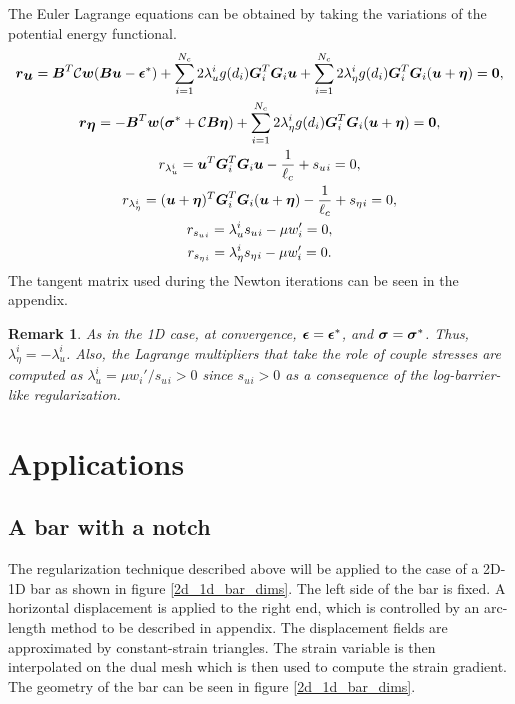 \documentclass[10pt]{elsarticle}
\newtheorem*{remark}{Remark}
\begin{document}
The Euler Lagrange equations can be obtained by taking the variations of the potential energy functional.
\begin{gather}
	\mbox{\boldmath $r$}_{\mbox{\boldmath $u$}} = \mbox{\boldmath $B$}^T \mathcal{C} \mbox{\boldmath $w$}(\mbox{\boldmath $B$} \mbox{\boldmath $u$} - \mbox{\boldmath $\epsilon$}^*) + \sum_{i=1}^{N_c} 2 \lambda_u^ i  g(d_i) \mbox{\boldmath $G$}_i ^T \mbox{\boldmath $G$}_i \mbox{\boldmath $u$}
	+\sum_{i=1}^{N_c} 2 \lambda_\eta^ i  g(d_i) \mbox{\boldmath $G$}_i ^T \mbox{\boldmath $G$}_i (\mbox{\boldmath $u$}+\mbox{\boldmath $\eta$}) = \bf0, \\
	\mbox{\boldmath $r$}_{\mbox{\boldmath $\eta$}} = -\mbox{\boldmath $B$}^T \mbox{\boldmath $w$}(\mbox{\boldmath $\sigma$}^*+ \mathcal{C} \mbox{\boldmath $B$} \mbox{\boldmath $\eta$} ) 
	+\sum_{i=1}^{N_c} 2 \lambda_\eta^ i  g(d_i) \mbox{\boldmath $G$}_i ^T \mbox{\boldmath $G$}_i (\mbox{\boldmath $u$}+\mbox{\boldmath $\eta$}) = \bf0, \\
	r_{\lambda_u^ i} = \mbox{\boldmath $u$} ^T \mbox{\boldmath $G$}_i ^T \mbox{\boldmath $G$}_i \mbox{\boldmath $u$} - \frac{1}{\ell_c} +  s_u{_i} = 0, \\
	r_{\lambda_\eta^ i} = (\mbox{\boldmath $u$}+\mbox{\boldmath $\eta$}) ^T \mbox{\boldmath $G$}_i ^T \mbox{\boldmath $G$}_i (\mbox{\boldmath $u$}+\mbox{\boldmath $\eta$}) - \frac{1}{\ell_c} +  s_\eta{_i} = 0, \\ 
	r_{s_u{_i}} = \lambda_u^ i s_u{_i} - \mu w_i'   = 0, \\
	r_{s_\eta{_i}} = \lambda_\eta^ i s_\eta{_i} - \mu w_i'   = 0.
\end{gather}
The tangent matrix used during the Newton iterations can be seen in the appendix.

\begin{remark}
As in the 1D case, at convergence, $\mbox{\boldmath $\epsilon$} = \mbox{\boldmath $\epsilon$}^*$, and $\mbox{\boldmath $\sigma$} = \mbox{\boldmath $\sigma$}^*$. Thus, $\lambda_\eta^ i = -\lambda_u^ i$. Also, the Lagrange multipliers that take the role of couple stresses are computed as $\lambda_u^ i  =  \mu w_i'/ s_u{_i} >0$ since $s_u{_i} >0$ as a consequence of the log-barrier-like regularization.
\end{remark}

\section{Applications}
\subsection{A bar with a notch}
The regularization technique described above will be applied to the case of a 2D-1D bar as shown in figure \ref{2d_1d_bar_dims}. The left side of the bar is fixed. A horizontal displacement is applied to the right end, which is controlled by an arc-length method to be described in appendix. The displacement fields are approximated by constant-strain triangles. The strain variable is then interpolated on the dual mesh which is then used to compute the strain gradient. The geometry of the bar can be seen in figure \ref{2d_1d_bar_dims}.
\end{document}
